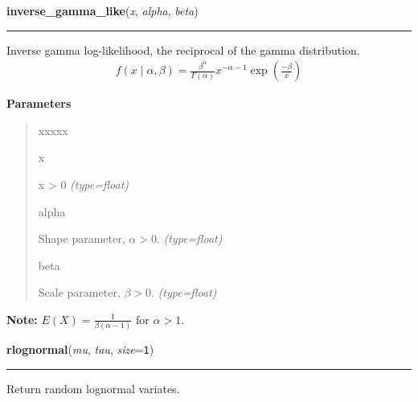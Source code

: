     \begin{boxedminipage}{\textwidth}

    \raggedright \textbf{inverse\_gamma\_like}(\textit{x}, \textit{alpha}, \textit{beta})

    \vspace{-1.5ex}

    \rule{\textwidth}{0.5\fboxrule}

Inverse gamma log-likelihood, the reciprocal of the gamma distribution.
\begin{equation*}\begin{split}f(x \mid \alpha, \beta) = \frac{\beta^{\alpha}}{\Gamma(\alpha)} x^{-\alpha - 1} \exp\left(\frac{-\beta}{x}\right)\end{split}\end{equation*}    \vspace{1ex}

      \textbf{Parameters}
      \begin{quote}
        \begin{Ventry}{xxxxx}

          \item[x]


x {\textgreater} 0
            \textit{(type=float)}

          \item[alpha]


Shape parameter, $\alpha > 0$.
            \textit{(type=float)}

          \item[beta]


Scale parameter, $\beta > 0$.
            \textit{(type=float)}

        \end{Ventry}

      \end{quote}

    \vspace{1ex}

\textbf{Note:} 
$E(X)=\frac{1}{\beta(\alpha-1)}$  for $\alpha > 1$.


    \end{boxedminipage}

    \label{pymc:distributions:rlognormal}

    \vspace{0.5ex}

    \begin{boxedminipage}{\textwidth}

    \raggedright \textbf{rlognormal}(\textit{mu}, \textit{tau}, \textit{size}=\texttt{1})

    \vspace{-1.5ex}

    \rule{\textwidth}{0.5\fboxrule}

Return random lognormal variates.
    \vspace{1ex}

    \end{boxedminipage}

